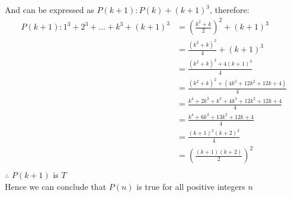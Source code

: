 \documentclass[12pt letter]{report}
\begin{document}
\begin{myproof}
  And can be expressed as $P \left( k + 1 \right): P \left( k \right) + \left( k + 1 \right)^3   $, therefore:
  \begin{align*}
    P \left( k + 1 \right): 1^3 + 2^3 + \ldots + k^3 +  \left( k + 1 \right)^3 & = \left( \frac{k^2 + k}{2} \right)^2 +
    \left( k + 1 \right)^3                                                                                                                                      \\
                                                                               & = \frac{\left( k^2 + k \right)^2 }{4} + \left( k + 1 \right)^3                 \\
                                                                               & = \frac{\left( k^2 + k \right)^2 + 4 \left( k + 1 \right)^3  }{4}              \\
                                                                               & = \frac{\left( k^2 + k \right)^2 + \left( 4k^3 + 12k^2 + 12k + 4 \right)  }{4} \\
                                                                               & = \frac{k^{4} + 2k^3 + k^2 +  4k^3 + 12k^2 + 12k + 4}{4}                       \\
                                                                               & = \frac{k^{4} + 6k^3 + 13k^2 + 12k + 4 }{4}                                    \\
                                                                               & = \frac{\left( k + 1 \right)^2 \left( k + 2 \right)^2}{4}                      \\
                                                                               & = \left( \frac{\left( k + 1 \right) \left( k +
    2\right)  }{2} \right)^2                                                                                                                                    \\
  \end{align*}
  $\therefore$ $P \left( k + 1 \right) $ is $T$ \\
  Hence we can conclude that $P \left( n \right) $ is true for all positive integers $n$

\end{myproof}

\end{document}
